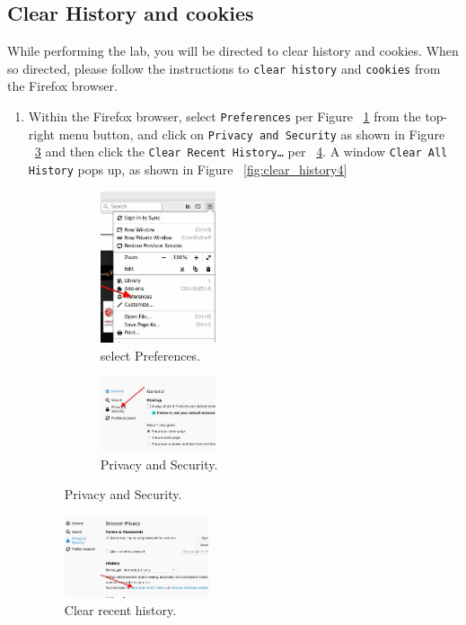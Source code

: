 \subsection{Clear History and cookies} 
While performing the lab, you will be directed to clear history and cookies.  When so directed,
please follow the instructions to {\tt clear history} and {\tt cookies} from the Firefox browser.

\begin{enumerate}
  \item Within the Firefox browser, select {\tt Preferences} per Figure ~\ref{fig:clear_history1} from the top-right menu button, and click on {\tt Privacy and Security} as shown in Figure ~\ref{fig:clear_history2} 
and then click the
{\tt Clear Recent History…} per ~\ref{fig:clear_history3}. A window {\tt Clear All History} pops up, as shown in Figure ~\ref{fig:clear_history4}

	\begin{figure}[H]
	\centering	
	\begin{subfigure}
	\centering	
	\includegraphics[width=0.4\textwidth]{Figs/clearhistory1.jpg}
	\caption{select Preferences.} 
	\label{fig:clear_history1}
	\end{subfigure}%
	\begin{subfigure}
	\centering	
	\includegraphics[width=0.4\textwidth]{Figs/clearhistory2.jpg}
	\caption{Privacy and Security.} 
	\label{fig:clear_history2}
	\end{subfigure}
	\end{figure}
	\begin{figure}[ht]
	\centering	
	\includegraphics[width=0.4\textwidth]{Figs/clearhistory3.jpg}
	\caption{Clear recent history.} 
	\label{fig:clear_history3}
	\end{figure}


\end{enumerate}
